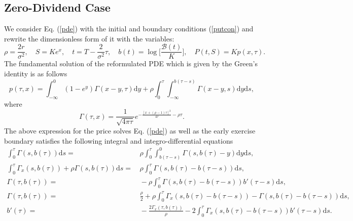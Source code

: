 \documentclass[fleqn,final,3p,11pt]{elsarticle}
\theoremstyle{definition}
\theoremstyle{remark}
\numberwithin{equation}{section}
\begin{document}
\begin{appendices}
\subsection{Zero-Dividend Case}
We consider Eq. (\ref{pde}) with the initial and boundary conditions (\ref{putcon}) and rewrite the dimensionless form of it with the variables:
\[ \rho = \frac{2r}{\sigma^{2}}, \quad S=Ke^{x}, \quad t=T-\frac{2}{\sigma^{2}}\tau, \quad b(t) = \log\Big[\frac{\mathcal{B}(t)}{K}\Big], \quad P(t,S)= Kp(x,\tau).\]
The fundamental solution of the reformulated PDE which is given by the Green's identity is as follows
\begin{equation}
p(\tau, x) = \int_{-\infty}^{0}(1-e^{y})\Gamma(x-y, \tau)\mathrm{d}y + \rho \int_{0}^{\tau}\int_{-\infty}^{b(\tau - s)}\Gamma(x-y, s)\mathrm{d}y\mathrm{d}s,
\end{equation}
where
\[\Gamma (\tau, x) = \frac{1}{\sqrt{4 \pi \tau}}e^{-\frac{[x+(\rho - 1)\tau]^{2}}{4 \tau}- \rho \tau}. \]
The above expression for the price solves Eq. (\ref{pde}) as well as the early exercise boundary satisfies the following integral and integro-differential  equations
\begin{equation}
\begin{split}
\int_{0}^{\tau}\Gamma (s, b(\tau))\mathrm{d}s =& \, \rho \int_{0}^{\tau}\int_{b(\tau -s)}^{0} \Gamma (s, b(\tau)-y)\mathrm{d}y\mathrm{d}s,\\
\int_{0}^{\tau} \Gamma_{x}(s, b(\tau)) + \rho \Gamma (s, b(\tau))\mathrm{d}s =& \,\rho \int_{0}^{\tau} \Gamma (s, b(\tau) - b(\tau -s))\mathrm{d}s,\\
\Gamma ( \tau, b(\tau)) = &\, - \rho \int_{0}^{\tau} \Gamma(s,b(\tau) - b(\tau -s)) b'(\tau -s )\mathrm{d}s,\\
\Gamma ( \tau, b(\tau)) = & \, \frac{\rho}{2} + \rho \int_{0}^{\tau} \Gamma_{x}(s,b(\tau) - b(\tau -s)) - \Gamma (s,b(\tau) - b(\tau -s)) \mathrm{d}s,\\
b'(\tau) = &\, - \frac{2 \Gamma_{x}( \tau, b(\tau))}{\rho} - 2 \int_{0}^{\tau} \Gamma_{x} (s,b(\tau) - b(\tau -s)) b'(\tau -s)\mathrm{d}s.
\end{split}
\end{equation}

\end{appendices}
\end{document}

